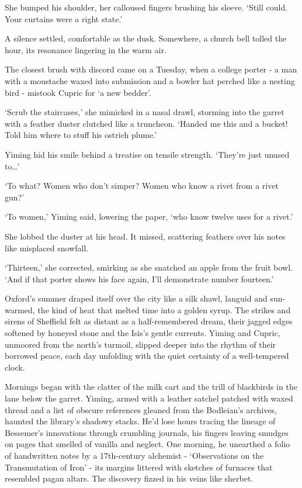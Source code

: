 She bumped his shoulder, her calloused fingers brushing his sleeve. `Still could. Your curtains were a right state.'

A silence settled, comfortable as the dusk. Somewhere, a church bell tolled the hour, its resonance lingering in the warm air.

The closest brush with discord came on a Tuesday, when a college porter - a man with a moustache waxed into submission and a bowler hat perched like a nesting bird - mistook Cupric for `a new bedder'.

`Scrub the staircases,' she mimicked in a nasal drawl, storming into the garret with a feather duster clutched like a truncheon. `Handed me this and a bucket! Told him where to stuff his ostrich plume.'

Yiming hid his smile behind a treatise on tensile strength. `They're just unused to\dots'

`To what? Women who don't simper? Women who know a rivet from a rivet gun?'

`To women,' Yiming said, lowering the paper, `who know twelve uses for a rivet.'

She lobbed the duster at his head. It missed, scattering feathers over his notes like misplaced snowfall.

`Thirteen,' she corrected, smirking as she snatched an apple from the fruit bowl. `And if that porter shows his face again, I'll demonstrate number fourteen.'

Oxford's summer draped itself over the city like a silk shawl, languid and sun-warmed, the kind of heat that melted time into a golden syrup. The strikes and sirens of Sheffield felt as distant as a half-remembered dream, their jagged edges softened by honeyed stone and the Isis's gentle currents. Yiming and Cupric, unmoored from the north's turmoil, slipped deeper into the rhythm of their borrowed peace, each day unfolding with the quiet certainty of a well-tempered clock.

Mornings began with the clatter of the milk cart and the trill of blackbirds in the lane below the garret. Yiming, armed with a leather satchel patched with waxed thread and a list of obscure references gleaned from the Bodleian's archives, haunted the library's shadowy stacks. He'd lose hours tracing the lineage of Bessemer's innovations through crumbling journals, his fingers leaving smudges on pages that smelled of vanilla and neglect. One morning, he unearthed a folio of handwritten notes by a 17th-century alchemist - `Observations on the Transmutation of Iron' - its margins littered with sketches of furnaces that resembled pagan altars. The discovery fizzed in his veins like sherbet.

